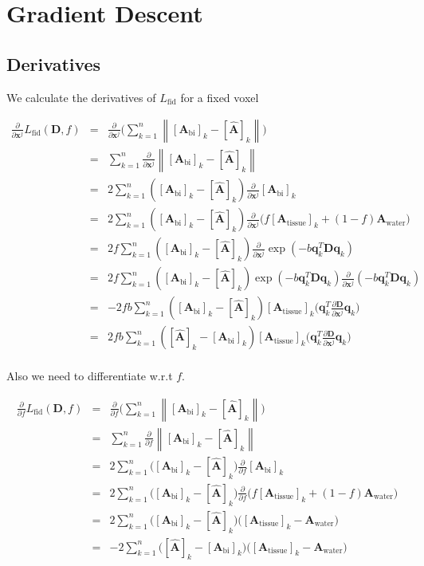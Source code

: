 \documentclass[12pt]{article}
\newcommand{\vect}[1]{\mathbf{#1}}
\newcommand{\Ahat}{\hat{\vect{A}}}
\newcommand{\Atissue}{\vect{A}_{\text{tissue}}}
\newcommand{\Awater}{\vect{A}_{\text{water}}}
\newcommand{\Abi}{\vect{A}_{\text{bi}}}
\newcommand{\vx}{\vect{x}}
\newcommand{\vD}{\vect{D}}
\newcommand{\vqk}{\vect{q}_k}
\newcommand{\pp}[1]{\frac{\partial}{\partial #1}}
\newcommand{\ppfull}[2]{\frac{\partial #2}{\partial #1}}
\begin{document}
\section{Gradient Descent}

\subsection{Derivatives}
We calculate the derivatives of $L_\text{fid}$ for a fixed voxel

\begin{eqnarray*}
\pp{\vx^j}L_\text{fid}(\vect{D}, f) &=& 
\pp{\vx^j} \bigg( \sum_{k=1}^n
        \left\lVert[\Abi]_k - 
[\Ahat]_k \right\rVert \bigg) 
    \\
&=&  \sum_{k=1}^n \pp{\vx^j}
        \left\lVert[\Abi]_k - 
[\Ahat]_k \right\rVert  
    \\
&=& 2 \sum_{k=1}^n \left( [\Abi]_k - [\Ahat]_k \right) 
\pp{\vx^j} [\Abi]_k 
    \\
&=& 2 \sum_{k=1}^n \left( [\Abi]_k - [\Ahat]_k \right) 
\pp{\vx^j} \big( f [\Atissue]_k + (1-f)\Awater \big)  
     \\
&=& 2 f \sum_{k=1}^n \left( [\Abi]_k - [\Ahat]_k \right) 
        \pp{\vx^j}  \exp(-b \vqk^T\vD\vqk)  
     \\
&=& 2 f \sum_{k=1}^n \left( [\Abi]_k - [\Ahat]_k \right) 
        \exp(-b \vqk^T\vD\vqk)  \pp{\vx^j} (-b \vqk^T\vD\vqk)
     \\
&=& -2 f b\sum_{k=1}^n \left( [\Abi]_k - [\Ahat]_k \right) 
        [\Atissue]_k \bigg(\vqk^T \ppfull{\vx^j}{\vD} \vqk \bigg)
     \\
&=& 2 f b\sum_{k=1}^n \left( [\Ahat]_k - [\Abi]_k \right) 
        [\Atissue]_k \bigg(\vqk^T \ppfull{\vx^j}{\vD} \vqk \bigg)
     \\
 \end{eqnarray*}

\noindent
Also we need to differentiate w.r.t $f$. 

\begin{eqnarray*}
\pp{f}L_\text{fid}(\vect{D}, f) &=& \pp{f} \bigg( \sum_{k=1}^n
   \left\lVert[\Abi]_k - [\Ahat]_k \right\rVert \bigg) 
    \\
&=& \sum_{k=1}^n \pp{f}
   \left\lVert[\Abi]_k - [\Ahat]_k \right\rVert 
    \\
&=& 2 \sum_{k=1}^n \big([\Abi]_k - [\Ahat]_k \big) \pp{f} [\Abi]_k 
    \\
&=& 2 \sum_{k=1}^n \big([\Abi]_k - [\Ahat]_k \big) 
        \pp{f} \big(f[\Atissue]_k + (1-f) \Awater \big)
    \\
&=& 2 \sum_{k=1}^n \big([\Abi]_k - [\Ahat]_k \big) 
        \big([\Atissue]_k - \Awater \big)
    \\
&=& -2 \sum_{k=1}^n \big([\Ahat]_k - [\Abi]_k \big) 
        \big([\Atissue]_k - \Awater \big)
    \\
\end{eqnarray*}
\end{document}
